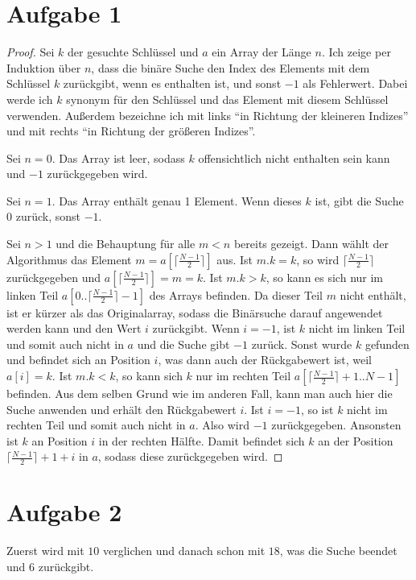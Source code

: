 \documentclass[10pt,a4paper]{article}
\begin{document}
\section{Aufgabe 1}
\begin{proof}
  Sei $k$ der gesuchte Schlüssel und $a$ ein Array der Länge $n$.
  Ich zeige per Induktion über $n$, dass die binäre Suche den Index des Elements mit dem Schlüssel $k$ zurückgibt, wenn es enthalten ist, und sonst $-1$ als Fehlerwert.
  Dabei werde ich $k$ synonym für den Schlüssel und das Element mit diesem Schlüssel verwenden.
  Außerdem bezeichne ich mit links ``in Richtung der kleineren Indizes'' und mit rechts ``in Richtung der größeren Indizes''.

  Sei $n = 0$.
  Das Array ist leer, sodass $k$ offensichtlich nicht enthalten sein kann und $-1$ zurückgegeben wird.

  Sei $n = 1$.
  Das Array enthält genau 1 Element.
  Wenn dieses $k$ ist, gibt die Suche $0$ zurück, sonst $-1$.

  Sei $n > 1$ und die Behauptung für alle $m < n$ bereits gezeigt.
  Dann wählt der Algorithmus das Element $m = a[\lceil \frac{N - 1}{2} \rceil]$ aus.
  Ist $m.k = k$, so wird $\lceil \frac{N - 1}{2} \rceil$ zurückgegeben und $a[\lceil \frac{N - 1}{2} \rceil] = m = k$.
  Ist $m.k > k$, so kann es sich nur im linken Teil $a[0 .. \lceil \frac{N - 1}{2} \rceil - 1]$ des Arrays befinden.
  Da dieser Teil $m$ nicht enthält, ist er kürzer als das Originalarray, sodass die Binärsuche darauf angewendet werden kann und den Wert $i$ zurückgibt.
  Wenn $i = -1$, ist $k$ nicht im linken Teil und somit auch nicht in $a$ und die Suche gibt $-1$ zurück.
  Sonst wurde $k$ gefunden und befindet sich an Position $i$, was dann auch der Rückgabewert ist, weil $a[i] = k$.
  Ist $m.k < k$, so kann sich $k$ nur im rechten Teil $a[\lceil \frac{N - 1}{2} \rceil + 1 .. N - 1]$ befinden.
  Aus dem selben Grund wie im anderen Fall, kann man auch hier die Suche anwenden und erhält den Rückgabewert $i$.
  Ist $i = -1$, so ist $k$ nicht im rechten Teil und somit auch nicht in $a$.
  Also wird $-1$ zurückgegeben.
  Ansonsten ist $k$ an Position $i$ in der rechten Hälfte.
  Damit befindet sich $k$ an der Position $\lceil \frac{N - 1}{2} \rceil + 1 + i$ in $a$, sodass diese zurückgegeben wird.
\end{proof}

\section{Aufgabe 2}
Zuerst wird mit $10$ verglichen und danach schon mit $18$, was die Suche beendet und $6$ zurückgibt.
\end{document}
